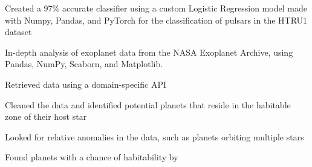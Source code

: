 \documentclass[]{resume-template}
\begin{document}
\begin{minipage}[t]{0.66\textwidth}
    \label{subsec:pulsar-identification}
    \begin{tightemize}
        \item Created a 97\% accurate classifier using a custom Logistic Regression model made with Numpy, Pandas, and PyTorch for the classification of pulsars in the HTRU1 dataset
    \end{tightemize}

    \label{subsec:exo-eda}
    \begin{tightemize}
        \item In-depth analysis of exoplanet data from the NASA Exoplanet Archive, using Pandas, NumPy,
        Seaborn, and Matplotlib.
        \item Retrieved data using a domain-specific API
        \item Cleaned the data and identified potential planets that reside in the habitable zone of their host star
        \item Looked for relative anomalies in the data, such as planets orbiting multiple stars
        \item Found planets with a chance of habitability by

    \end{tightemize}
    \vspace{\topsep}


\end{minipage}
\end{document}
